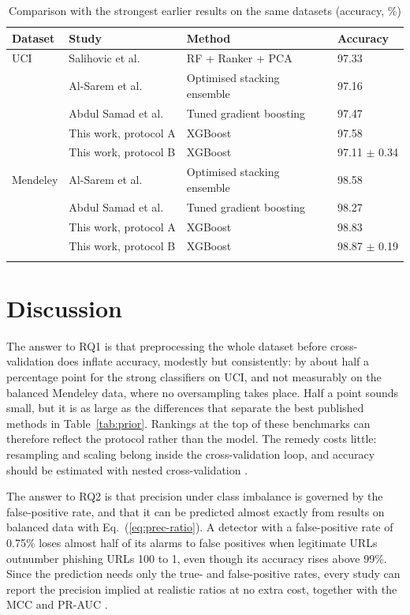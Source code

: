 \documentclass[pdflatex,sn-mathphys-num]{sn-jnl}%
\theoremstyle{thmstyleone}%
\theoremstyle{thmstyletwo}%
\theoremstyle{thmstylethree}%
\begin{document}
\begin{table}[htbp]
\caption{Comparison with the strongest earlier results on the same datasets (accuracy, \%)}\label{tab:compare}%
\begin{tabular}{@{}llll@{}}
\toprule
Dataset & Study & Method & Accuracy\\
\midrule
UCI & Salihovic et al.\ \cite{salihovic2019} & RF + Ranker + PCA & 97.33 \\
 & Al-Sarem et al.\ \cite{alsarem2021} & Optimised stacking ensemble & 97.16 \\
 & Abdul Samad et al.\ \cite{abdulsamad2023} & Tuned gradient boosting & 97.47 \\
 & This work, protocol A & XGBoost & 97.58 \\
 & This work, protocol B & XGBoost & 97.11 $\pm$ 0.34 \\
\midrule
Mendeley & Al-Sarem et al.\ \cite{alsarem2021} & Optimised stacking ensemble & 98.58 \\
 & Abdul Samad et al.\ \cite{abdulsamad2023} & Tuned gradient boosting & 98.27 \\
 & This work, protocol A & XGBoost & 98.83 \\
 & This work, protocol B & XGBoost & 98.87 $\pm$ 0.19 \\
\botrule
\end{tabular}
\end{table}

\section{Discussion}\label{sec6}

The answer to RQ1 is that preprocessing the whole dataset before cross-validation does inflate accuracy, modestly but consistently: by about half a percentage point for the strong classifiers on UCI, and not measurably on the balanced Mendeley data, where no oversampling takes place. Half a point sounds small, but it is as large as the differences that separate the best published methods in Table~\ref{tab:prior}. Rankings at the top of these benchmarks can therefore reflect the protocol rather than the model. The remedy costs little: resampling and scaling belong inside the cross-validation loop, and accuracy should be estimated with nested cross-validation \cite{varma2006}.

The answer to RQ2 is that precision under class imbalance is governed by the false-positive rate, and that it can be predicted almost exactly from results on balanced data with Eq.~(\ref{eq:prec-ratio}). A detector with a false-positive rate of 0.75\% loses almost half of its alarms to false positives when legitimate URLs outnumber phishing URLs 100 to 1, even though its accuracy rises above 99\%. Since the prediction needs only the true- and false-positive rates, every study can report the precision implied at realistic ratios at no extra cost, together with the MCC and PR-AUC \cite{saito2015,chicco2020}.
\end{document}
